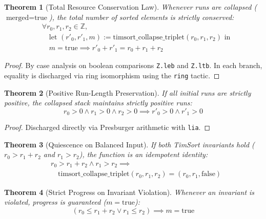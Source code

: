 \documentclass[10pt,journal,compsoc]{IEEEtran}
\newtheorem{theorem}{Theorem}
\begin{document}
\begin{theorem}[Total Resource Conservation Law]
Whenever runs are collapsed ($\text{merged} = \text{true}$), the total number of sorted elements is strictly conserved:
\begin{align}
&\forall r_0, r_1, r_2 \in \mathbb{Z}, \nonumber \\
&\quad \text{let } (r'_0, r'_1, m) := \text{timsort\_collapse\_triplet}(r_0, r_1, r_2) \text{ in} \nonumber \\
&\quad m = \text{true} \implies r'_0 + r'_1 = r_0 + r_1 + r_2
\end{align}
\end{theorem}
\begin{proof}
By case analysis on boolean comparisons \texttt{Z.leb} and \texttt{Z.ltb}. In each branch, equality is discharged via ring isomorphism using the \texttt{ring} tactic.
\end{proof}

\begin{theorem}[Positive Run-Length Preservation]
If all initial runs are strictly positive, the collapsed stack maintains strictly positive runs:
\begin{equation}
r_0 > 0 \land r_1 > 0 \land r_2 > 0 \implies r'_0 > 0 \land r'_1 > 0
\end{equation}
\end{theorem}
\begin{proof}
Discharged directly via Presburger arithmetic with \texttt{lia}.
\end{proof}

\begin{theorem}[Quiescence on Balanced Input]
If both TimSort invariants hold ($r_0 > r_1 + r_2$ and $r_1 > r_2$), the function is an idempotent identity:
\begin{align}
&r_0 > r_1 + r_2 \land r_1 > r_2 \implies \nonumber \\
&\quad \text{timsort\_collapse\_triplet}(r_0, r_1, r_2) = (r_0, r_1, \text{false})
\end{align}
\end{theorem}

\begin{theorem}[Strict Progress on Invariant Violation]
Whenever an invariant is violated, progress is guaranteed ($m = \text{true}$):
\begin{equation}
(r_0 \le r_1 + r_2 \lor r_1 \le r_2) \implies m = \text{true}
\end{equation}
\end{theorem}
\end{document}
